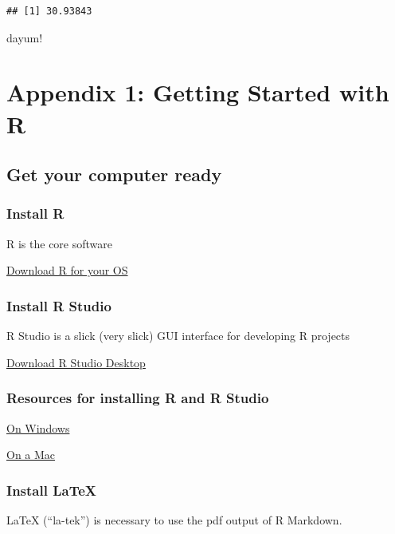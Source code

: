 \documentclass[]{book}
\theoremstyle{definition}
\theoremstyle{definition}
\theoremstyle{definition}
\theoremstyle{remark}
\begin{document}
\begin{verbatim}
## [1] 30.93843
\end{verbatim}

dayum!

\chapter*{Appendix 1: Getting Started with
R}\label{appendix-1-getting-started-with-r}

\section{Get your computer ready}\label{get-your-computer-ready}

\subsection{Install R}\label{install-r}

R is the core software

\href{https://cran.r-project.org}{Download R for your OS}

\subsection{Install R Studio}\label{install-r-studio}

R Studio is a slick (very slick) GUI interface for developing R projects

\href{https://www.rstudio.com/products/rstudio/download/}{Download R
Studio Desktop}

\subsection{Resources for installing R and R
Studio}\label{resources-for-installing-r-and-r-studio}

\href{https://medium.com/@GalarnykMichael/install-r-and-rstudio-on-windows-5f503f708027}{On
Windows}

\href{https://medium.com/@GalarnykMichael/install-r-and-rstudio-on-mac-e911606ce4f4}{On
a Mac}

\subsection{Install LaTeX}\label{install-latex}

LaTeX (``la-tek'') is necessary to use the pdf output of R Markdown.
\end{document}
